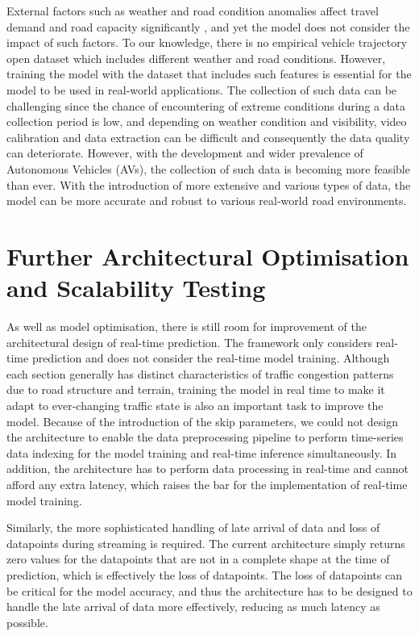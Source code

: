 \documentclass[11pt]{uonthesis}
\begin{document}
External factors such as weather and road condition anomalies affect travel demand and road capacity significantly \cite{WANG2023107044}, and yet the model does not consider the impact of such factors. To our knowledge, there is no empirical vehicle trajectory open dataset which includes different weather and road conditions. However, training the model with the dataset that includes such features is essential for the model to be used in real-world applications. The collection of such data can be challenging since the chance of encountering of extreme conditions during a data collection period is low, and depending on weather condition and visibility, video calibration and data extraction can be difficult and consequently the data quality can deteriorate. However, with the development and wider prevalence of Autonomous Vehicles (AVs), the collection of such data is becoming more feasible than ever. With the introduction of more extensive and various types of data, the model can be more accurate and robust to various real-world road environments. 

\section{Further Architectural Optimisation and Scalability Testing}

As well as model optimisation, there is still room for improvement of the architectural design of real-time prediction. The framework only considers real-time prediction and does not consider the real-time model training. Although each section generally has distinct characteristics of traffic congestion patterns due to road structure and terrain, training the model in real time to make it adapt to ever-changing traffic state is also an important task to improve the model. Because of the introduction of the skip parameters, we could not design the architecture to enable the data preprocessing pipeline to perform time-series data indexing for the model training and real-time inference simultaneously. In addition, the architecture has to perform data processing in real-time and cannot afford any extra latency, which raises the bar for the implementation of real-time model training.

Similarly, the more sophisticated handling of late arrival of data and loss of datapoints during streaming is required. The current architecture simply returns zero values for the datapoints that are not in a complete shape at the time of prediction, which is effectively the loss of datapoints. The loss of datapoints can be critical for the model accuracy, and thus the architecture has to be designed to handle the late arrival of data more effectively, reducing as much latency as possible.
\end{document}
